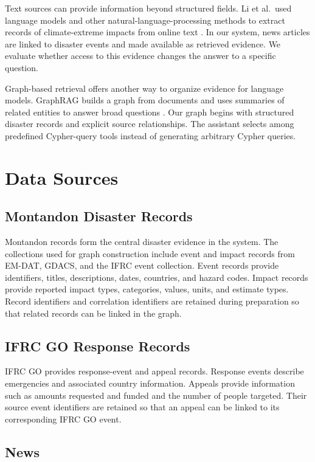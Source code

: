 \documentclass[journal]{IEEEtran}
\begin{document}
Text sources can provide information beyond structured fields.
Li et al.\ used language models and other natural-language-processing
methods to extract records of climate-extreme impacts from online
text \cite{li2024climateimpacts}. In our system, news articles are
linked to disaster events and made available as retrieved evidence.
We evaluate whether access to this evidence changes the answer to a
specific question.

Graph-based retrieval offers another way to organize evidence for
language models. GraphRAG builds a graph from documents and uses
summaries of related entities to answer broad questions
\cite{edge2024graphrag}. Our graph begins with structured disaster
records and explicit source relationships. The assistant selects
among predefined Cypher-query tools instead of generating arbitrary
Cypher queries.

\section{Data Sources}

\subsection{Montandon Disaster Records}

Montandon records form the central disaster evidence in the system.
The collections used for graph construction include event and impact
records from EM-DAT, GDACS, and the IFRC event collection. Event
records provide identifiers, titles, descriptions, dates, countries,
and hazard codes. Impact records provide reported impact types,
categories, values, units, and estimate types. Record identifiers
and correlation identifiers are retained during preparation so that
related records can be linked in the graph.

\subsection{IFRC GO Response Records}

IFRC GO provides response-event and appeal records. Response events
describe emergencies and associated country information. Appeals
provide information such as amounts requested and funded and the
number of people targeted. Their source event identifiers are retained
so that an appeal can be linked to its corresponding IFRC GO event.

\subsection{News}
\end{document}
